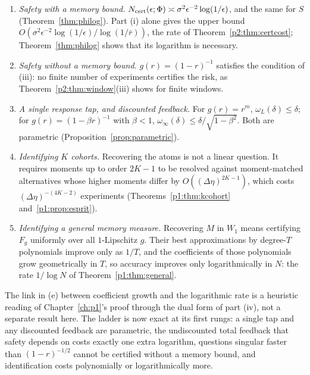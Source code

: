 \begin{corollary}\label{cor:cases}
\begin{enumerate}[label=(\alph*)]
\item \emph{Safety with a memory bound.} $N_{\rm cert}(\epsilon;\Phi)\asymp\sigma^2\epsilon^{-2}\log(1/\epsilon)$, and the same for $S$ (Theorem~\ref{thm:philog}). Part (i) alone gives the upper bound $O(\sigma^2\epsilon^{-2}\log(1/\epsilon)/\log(1/\bar r))$, the rate of Theorem~\ref{p2:thm:certcost}; Theorem~\ref{thm:philog} shows that its logarithm is necessary. \hfill\Proved
\item \emph{Safety without a memory bound.} $g(r)=(1-r)^{-1}$ satisfies the condition of (iii): no finite number of experiments certifies the risk, as Theorem~\ref{p2:thm:window}(iii) shows for finite windows. \hfill{}
\item \emph{A single response tap, and discounted feedback.} For $g(r)=r^m$, $\omega_L(\delta)\le\delta$; for $g(r)=(1-\beta r)^{-1}$ with $\beta<1$, $\omega_\infty(\delta)\le\delta/\sqrt{1-\beta^2}$. Both are parametric (Proposition~\ref{prop:parametric}). \hfill\Proved
\item \emph{Identifying $K$ cohorts.} Recovering the atoms is not a linear question. It requires moments up to order $2K-1$ to be resolved against moment-matched alternatives whose higher moments differ by $O((\Delta\eta)^{2K-1})$, which costs $(\Delta\eta)^{-(4K-2)}$ experiments (Theorems~\ref{p1:thm:kcohort} and~\ref{p1:prop:esprit}). \hfill{}
\item \emph{Identifying a general memory measure.} Recovering $M$ in $W_1$ means certifying $F_g$ uniformly over all $1$-Lipschitz $g$. Their best approximations by degree-$T$ polynomials improve only as $1/T$, and the coefficients of those polynomials grow geometrically in $T$, so accuracy improves only logarithmically in $N$: the rate $1/\log N$ of Theorem~\ref{p1:thm:general}. \hfill{}
\end{enumerate}
\end{corollary}

The link in (e) between coefficient growth and the logarithmic rate is a heuristic reading of Chapter~\ref{ch:p1}'s proof through the dual form of part (iv), not a separate result here. The ladder is now exact at its first rungs: a single tap and any discounted feedback are parametric, the undiscounted total feedback that safety depends on costs exactly one extra logarithm, questions singular faster than $(1-r)^{-1/2}$ cannot be certified without a memory bound, and identification costs polynomially or logarithmically more.

